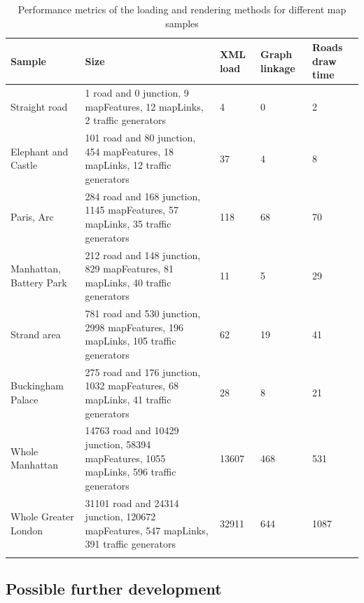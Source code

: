 \begin{center}
\begin{longtabu} to \textwidth {|
    X[2,l]|
    X[4,l]|
    X[3,c]|
    X[3,c]|
    X[3,c]|
    }
    \hline
    \textbf{Sample} & \textbf{Size} & \textbf{XML load} & \textbf{Graph linkage} & \textbf{Roads draw time} \\ \hline
Straight road & 1 road and 0 junction, 9 mapFeatures, 12 mapLinks, 2 traffic generators & 4 & 0 & 2 \\ \hline
Elephant and Castle & 101 road and 80 junction, 454 mapFeatures, 18 mapLinks, 12 traffic generators & 37 & 4 & 8 \\ \hline
Paris, Arc & 284 road and 168 junction, 1145 mapFeatures, 57 mapLinks, 35 traffic generators & 118 & 68 & 70 \\ \hline
Manhattan, Battery Park & 212 road and 148 junction, 829 mapFeatures, 81 mapLinks, 40 traffic generators & 11 & 5 & 29 \\ \hline
Strand area & 781 road and 530 junction, 2998 mapFeatures, 196 mapLinks, 105 traffic generators & 62 & 19 & 41 \\ \hline
Buckingham Palace& 275 road and 176 junction, 1032 mapFeatures, 68 mapLinks, 41 traffic generators & 28 & 8 & 21 \\ \hline
Whole Manhattan & 14763 road and 10429 junction, 58394 mapFeatures, 1055 mapLinks, 596 traffic generators & 13607 & 468 & 531 \\ \hline
Whole Greater London & 31101 road and 24314 junction, 120672 mapFeatures, 547 mapLinks, 391 traffic generators & 32911 & 644 & 1087 \\ \hline

\caption{Performance metrics of the loading and rendering methods for different map samples}
\label{table:performanceComparison}
\end{longtabu}
\end{center}


\subsection{Possible further development}



